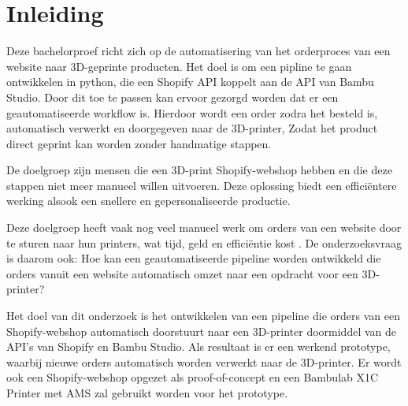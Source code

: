 


% 

\section{Inleiding}%
\label{sec:inleiding}

Deze bachelorproef richt zich op de automatisering van het orderproces van een website naar 3D-geprinte producten. Het doel is om een pipline te gaan ontwikkelen in python, die een Shopify API koppelt aan de API van Bambu Studio. Door dit toe te passen kan ervoor gezorgd worden dat er een geautomatiseerde workflow is. Hierdoor wordt een order zodra het besteld is, automatisch verwerkt en doorgegeven naar de 3D-printer, Zodat het product direct geprint kan worden zonder handmatige stappen.

De doelgroep zijn mensen die een 3D-print Shopify-webshop hebben en die deze stappen niet meer manueel willen uitvoeren. Deze oplossing biedt een efficiëntere werking alsook een snellere en gepersonaliseerde productie.

Deze doelgroep heeft vaak nog veel manueel werk om orders van een website door te sturen naar hun printers, wat tijd, geld en efficiëntie kost . De onderzoeksvraag is daarom ook: Hoe kan een geautomatiseerde pipeline worden ontwikkeld die orders vanuit een website automatisch omzet naar een opdracht voor een 3D-printer?

Het doel van dit onderzoek is het ontwikkelen van een pipeline die orders van een Shopify-webshop automatisch doorstuurt naar een 3D-printer doormiddel van de API's van Shopify en Bambu Studio. Als resultaat is er een werkend prototype, waarbij nieuwe orders automatisch worden verwerkt naar de 3D-printer. Er wordt ook een Shopify-webshop opgezet als proof-of-concept en een Bambulab  X1C Printer met AMS zal gebruikt worden voor het prototype.


